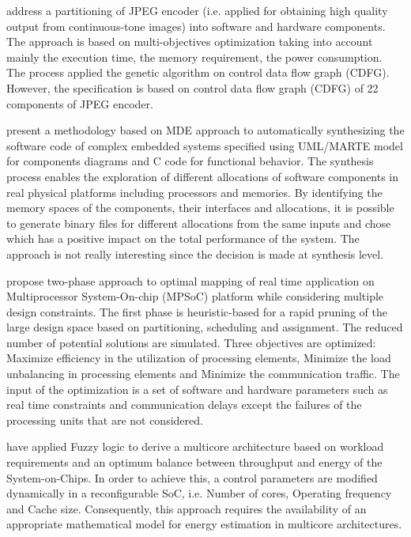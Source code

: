 \documentclass[3p,times,procedia,authoryear,round]{elsarticle}
\begin{document}
\cite{Nath201430} address a partitioning of JPEG encoder (i.e. applied for obtaining high quality output from continuous-tone images) into software and hardware components. The approach is based on multi-objectives optimization taking into account mainly the execution time, the memory requirement, the power consumption. The process  applied the genetic algorithm on control data flow graph (CDFG). However, the specification is based on control data flow graph (CDFG) of 22 components of JPEG encoder.  





\cite{Posadas20141281} present a methodology based on MDE approach to automatically synthesizing the software code of complex embedded systems specified using UML/MARTE model for components diagrams and C code for functional behavior. The synthesis process enables the exploration of different allocations of software components in real physical platforms including processors and memories. By identifying the memory spaces of the components, their interfaces and allocations, it is possible to generate binary files for different allocations from the same inputs and chose which has a positive impact on the total performance of the system. The approach is not really interesting since the decision is made at synthesis level. 

\cite{Jia2014} propose two-phase approach to optimal mapping of real time application on Multiprocessor System-On-chip (MPSoC) platform while considering multiple design constraints. The first phase is heuristic-based for a rapid pruning of the large design space based on partitioning, scheduling and assignment. The reduced number of potential solutions are simulated. Three objectives are optimized: Maximize efficiency in the utilization of processing elements, Minimize the load unbalancing in processing elements and Minimize the communication traffic. The input of the optimization is a set of  software and hardware parameters such as real time constraints and communication delays except the failures of the processing units that are not considered.

\cite{Qadri2016} have applied Fuzzy logic to derive a  multicore architecture based on workload requirements and an optimum balance between throughput and energy of the System-on-Chips. In order  to achieve this, a control parameters are modified dynamically in a reconfigurable SoC, i.e.  Number of cores, Operating frequency and Cache size. Consequently, this approach requires the availability of an appropriate mathematical model for energy estimation in multicore architectures. 
\end{document}
